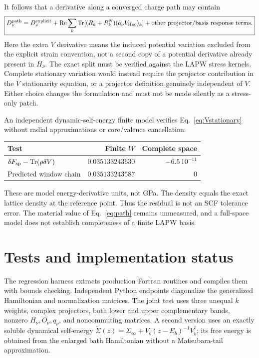 \documentclass[11pt]{article}
\newcommand{\Tr}{\operatorname{Tr}}
\newcommand{\Rea}{\operatorname{Re}}
\newcommand{\Sig}{\widetilde\Sigma}
\begin{document}
It follows that a derivative along a converged charge path may contain
\begin{equation}
\boxed{D^{\rm path}_\nu
 =D^{\rm explicit}_\nu+
 \Rea\sum_k\Tr[(R_k+R_k^N)(\partial_\nu V_{\rm Hxc})_k]
 +\text{other projector/basis response terms}.}\label{eq:path}
\end{equation}
Here the extra $V$ derivative means the induced potential variation excluded
from the explicit strain convention, not a second copy of a potential
derivative already present in $H_\nu$. The exact split must be verified
against the LAPW stress kernels. Complete stationary variation would instead
require the projector contribution in the $V$ stationarity equation, or a
projector definition genuinely independent of $V$. Either choice changes
the formulation and must not be made silently as a stress-only patch.

An independent dynamic-self-energy finite model verifies
Eq.~\eqref{eq:Vstationary} without radial approximations or core/valence
cancellation:
\begin{center}
\begin{tabular}{lrr}\toprule
Test & Finite $W$ & Complete space\\\midrule
$\delta F_{\rm sp}-\Tr(\rho\delta V)$ & $0.035133243630$ & $-6.5\,10^{-11}$\\
Predicted window chain & $0.035133243587$ & $0$\\\bottomrule
\end{tabular}
\end{center}
These are model energy-derivative units, not GPa. The density equals the
exact lattice density at the reference point. Thus the residual is not
an SCF tolerance error. The material value of Eq.~\eqref{eq:path} remains
unmeasured, and a full-space model does not establish completeness of a
finite LAPW basis.

\section{Tests and implementation status}
The regression harness extracts production Fortran routines and compiles
them with bounds checking. Independent Python endpoints diagonalize the
generalized Hamiltonian and normalization matrices. The joint test uses
three unequal $k$ weights, complex projectors, both lower and upper
complementary bands, nonzero $H_\nu,O_\nu,q_\nu$, and noncommuting matrices.
A second version uses an exactly soluble dynamical self-energy
$\Sig(z)=\Sigma_\infty+V_b(z-E_b)^{-1}V_b^\dagger$; its free energy is obtained
from the enlarged bath Hamiltonian without a Matsubara-tail approximation.
\end{document}
